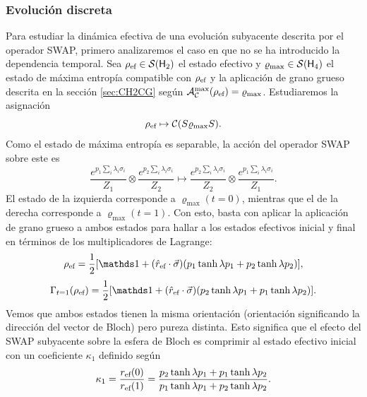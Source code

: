 \subsubsection{Evolución discreta}

Para estudiar la dinámica efectiva de una evolución subyacente descrita por el operador SWAP, primero analizaremos el caso en que no se ha introducido la dependencia temporal. Sea $\rho_{\text{ef}}\in\mathcal{S}({\sf H}_{2})$ el estado efectivo y $\varrho_{\max}\in\mathcal{S}({\sf H}_{4})$ el estado de máxima entropía compatible con $\rho_{\text{ef}}$ y la aplicación de grano grueso descrita en la sección \ref{sec:CH2CG} según $\mathcal{A}_{\mathcal{C}}^{\max}(\rho_{\text{ef}})=\varrho_{\max}$. Estudiaremos la asignación
\begin{equation}
  \rho_{\text{ef}}\mapsto \mathcal{C}(S \varrho_{\max} S).
\end{equation}
Como el estado de máxima entropía es separable, la acción del operador SWAP sobre este es
\begin{equation}
  \frac{e^{p_{1}\sum_{i}\lambda_{i}\sigma_{i}}}{Z_{1}} \otimes \frac{e^{p_{2}\sum_{i}\lambda_{i}\sigma_{i}}}{Z_{2}}\mapsto\frac{e^{p_{2}\sum_{i}\lambda_{i}\sigma_{i}}}{Z_{2}}\otimes\frac{e^{p_{1}\sum_{i}\lambda_{i}\sigma_{i}}}{Z_{1}}.\nonumber
\end{equation}
El estado de la izquierda corresponde a $\varrho_{\max}(t=0)$, mientras que el de la derecha corresponde a $\varrho_{\max}(t=1)$. Con esto, basta con aplicar la aplicación de grano grueso a ambos estados para hallar a los estados efectivos inicial y final en términos de los multiplicadores de Lagrange:
\begin{equation}
\rho_{\ef}=\frac{1}{2}[\Id+(\hat{r}_{\ef}\cdot\vec{\sigma})(p_{1}\tanh{\lambda p_{1}}+p_{2}\tanh{\lambda p_{2}})],
\end{equation}
\begin{equation}
\Gamma_{t=1}(\rho_{\ef})=\frac{1}{2}[\Id+(\hat{r}_{\ef}\cdot\vec{\sigma})(p_{2}\tanh{\lambda p_{1}}+p_{1}\tanh{\lambda p_{2}})].
\end{equation}
Vemos que ambos estados tienen la misma orientación (orientación significando la dirección del vector de Bloch) pero pureza distinta. Esto significa que el efecto del \textsc{SWAP} subyacente sobre la esfera de Bloch es comprimir al estado efectivo inicial con un coeficiente $\kappa_{1}$ definido según
\begin{equation}\label{eq:SWAPFactor}
  \kappa_{1}=\frac{r_{\text{ef}}(0)}{r_{\text{ef}}(1)}=\frac{p_{2}\tanh{\lambda p_{1}}+p_{1}\tanh{\lambda p_{2}}}{
    p_{1}\tanh{\lambda p_{1}}+p_{2}\tanh{\lambda p_{2}}}.
\end{equation}
